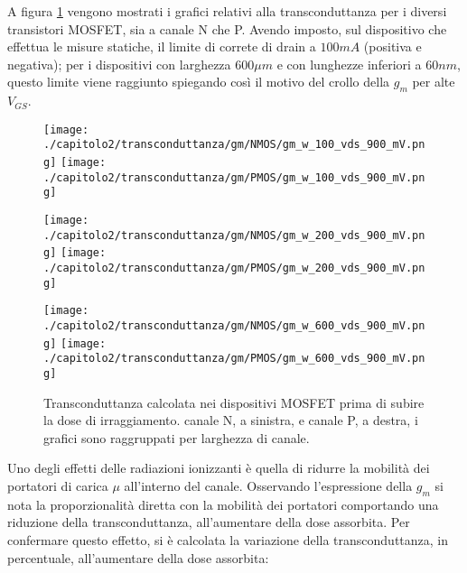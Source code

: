 \vspace{0.5cm}

A figura \ref{fig:gm_w} vengono mostrati i grafici relativi alla transconduttanza per i diversi transistori MOSFET, sia a canale N che P. Avendo imposto, sul dispositivo che effettua le misure statiche, il limite di correte di drain a $100mA$ (positiva e negativa); per i dispositivi con larghezza $600\mu m$ e con lunghezze inferiori a $60nm$, questo limite viene raggiunto spiegando così il motivo del crollo della $g_m$ per alte $V_{GS}$.

\begin{figure}[t]
    \centering
    \texttt{[image: ./capitolo2/transconduttanza/gm/NMOS/gm\_w\_100\_vds\_900\_mV.png]}
    \texttt{[image: ./capitolo2/transconduttanza/gm/PMOS/gm\_w\_100\_vds\_900\_mV.png]}

    \vspace{0.5cm}
    \texttt{[image: ./capitolo2/transconduttanza/gm/NMOS/gm\_w\_200\_vds\_900\_mV.png]}
    \texttt{[image: ./capitolo2/transconduttanza/gm/PMOS/gm\_w\_200\_vds\_900\_mV.png]}
    \vspace{0.5cm}

    \texttt{[image: ./capitolo2/transconduttanza/gm/NMOS/gm\_w\_600\_vds\_900\_mV.png]}
    \texttt{[image: ./capitolo2/transconduttanza/gm/PMOS/gm\_w\_600\_vds\_900\_mV.png]}

    \caption[Dati $g_m$ estratti pre-irraggiamento]{Transconduttanza calcolata nei dispositivi MOSFET prima di subire la dose di irraggiamento. canale N, a sinistra, e canale P, a destra, i grafici sono raggruppati per larghezza di canale.}
    \label{fig:gm_w}

\end{figure}


\vspace{0.5cm}

Uno degli effetti delle radiazioni ionizzanti è quella di ridurre la mobilità dei portatori di carica $\mu$ all'interno del canale. Osservando  l'espressione della $g_m$ si nota la proporzionalità diretta con la mobilità dei portatori comportando una riduzione della transconduttanza, all'aumentare della dose assorbita. Per confermare questo effetto, si è calcolata la variazione della transconduttanza, in percentuale, all'aumentare della dose assorbita:

